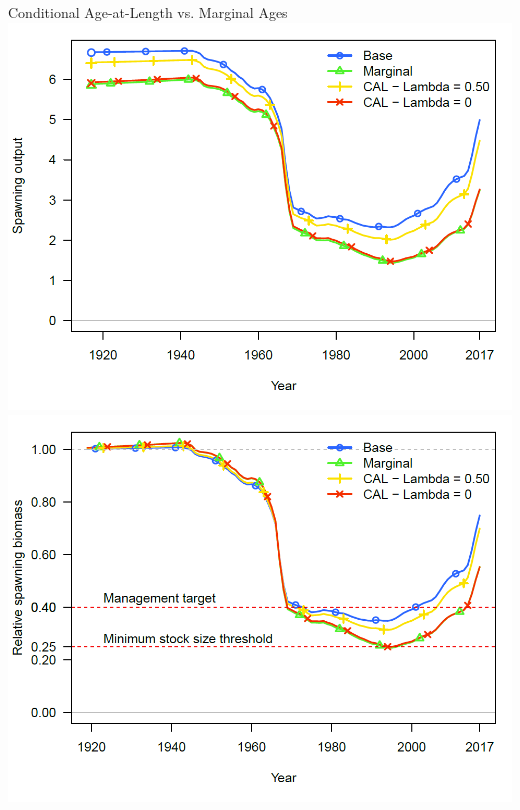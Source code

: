 \documentclass[pdf]{beamer}\usepackage[]{graphicx}\usepackage[]{color}
\begin{document}
\begin{frame}{Conditional Age-at-Length vs. Marginal Ages}
  \includegraphics[scale = 0.24]{figures/CAL_Marg_Lambda_ssb.png}
  \includegraphics[scale = 0.24]{figures/CAL_Marg_Lambda_depl.png}
\end{frame}
\end{document}
